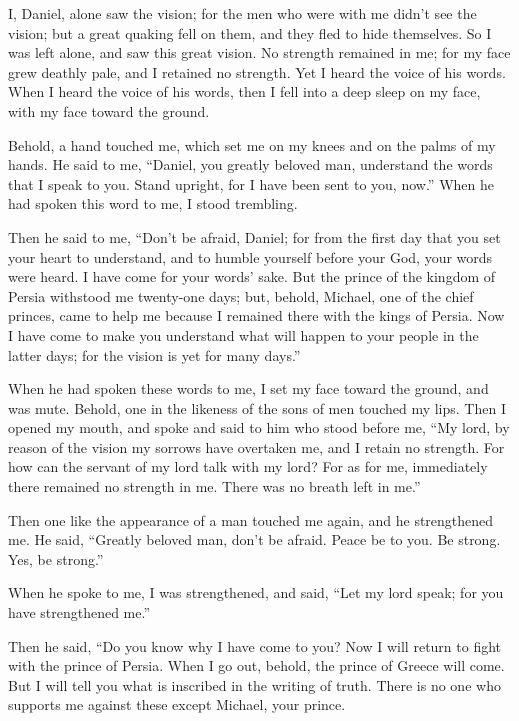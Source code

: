  I, Daniel, alone saw the vision; for the men who were
with me didn't see the vision; but a great quaking fell on them, and
they fled to hide themselves.  So I was left alone, and
saw this great vision. No strength remained in me; for my face grew
deathly pale, and I retained no strength.  Yet I heard the
voice of his words. When I heard the voice of his words, then I fell
into a deep sleep on my face, with my face toward the ground.

 Behold, a hand touched me, which set me on my knees and
on the palms of my hands.  He said to me, ``Daniel, you
greatly beloved man, understand the words that I speak to you. Stand
upright, for I have been sent to you, now.'' When he had spoken this
word to me, I stood trembling.

 Then he said to me, ``Don't be afraid, Daniel; for from
the first day that you set your heart to understand, and to humble
yourself before your God, your words were heard. I have come for your
words' sake.  But the prince of the kingdom of Persia
withstood me twenty-one days; but, behold, Michael, one of the chief
princes, came to help me because I remained there with the kings of
Persia.  Now I have come to make you understand what will
happen to your people in the latter days; for the vision is yet for many
days.''

 When he had spoken these words to me, I set my face
toward the ground, and was mute.  Behold, one in the
likeness of the sons of men touched my lips. Then I opened my mouth, and
spoke and said to him who stood before me, ``My lord, by reason of the
vision my sorrows have overtaken me, and I retain no strength.
 For how can the servant of my lord talk with my lord?
For as for me, immediately there remained no strength in me. There was
no breath left in me.''

 Then one like the appearance of a man touched me again,
and he strengthened me.  He said, ``Greatly beloved man,
don't be afraid. Peace be to you. Be strong. Yes, be strong.''

When he spoke to me, I was strengthened, and said, ``Let my lord speak;
for you have strengthened me.''

 Then he said, ``Do you know why I have come to you? Now
I will return to fight with the prince of Persia. When I go out, behold,
the prince of Greece will come.  But I will tell you what
is inscribed in the writing of truth. There is no one who supports me
against these except Michael, your prince.

